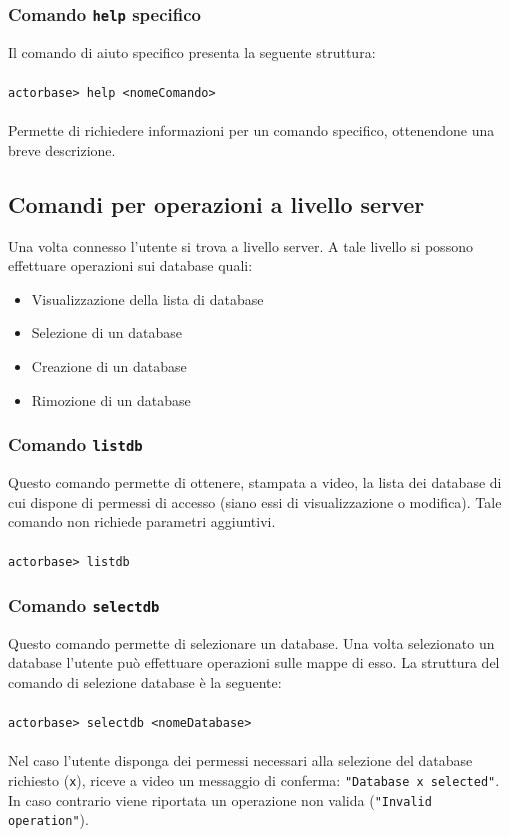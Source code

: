\documentclass[a4paper]{article}
\begin{document}
	\subsubsection{Comando \texttt{help} specifico}
	Il comando di aiuto specifico presenta la seguente struttura:
	\\ \\
	\texttt{actorbase>	help <nomeComando>}
	\\ \\
	Permette di richiedere informazioni per un comando specifico, ottenendone una breve descrizione.
	
	\subsection{Comandi per operazioni a livello server}
	Una volta connesso l'utente si trova a livello server. A tale livello si possono effettuare operazioni sui database quali:
	\begin{itemize}
		\item Visualizzazione della lista di database
		\item Selezione di un database
		\item Creazione di un database
		\item Rimozione di un database
	\end{itemize}
	
	\subsubsection{Comando \texttt{listdb}}
	Questo comando permette di ottenere, stampata a video, la lista dei database di cui dispone di permessi di accesso (siano essi di visualizzazione o modifica). Tale comando non richiede parametri aggiuntivi.
	\\ \\
	\texttt{actorbase>	listdb}

	\subsubsection{Comando \texttt{selectdb}}
	Questo comando permette di selezionare un database. Una volta selezionato un database l'utente può effettuare operazioni sulle mappe di esso. La struttura del comando di selezione database è la seguente:
	\\ \\
	\texttt{actorbase>	selectdb <nomeDatabase>}
	\\ \\
	Nel caso l'utente disponga dei permessi necessari alla selezione del database richiesto (\texttt{x}), riceve a video un messaggio di conferma: \texttt{"Database x selected"}. In caso contrario viene riportata un operazione non valida (\texttt{"Invalid operation"}).
\end{document}
